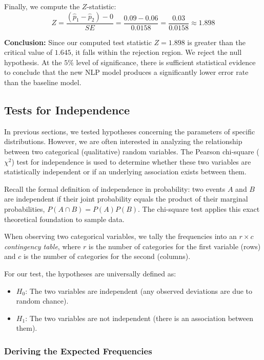 \documentclass{article}
\begin{document}
Finally, we compute the $Z$-statistic:
$$ Z = \frac{(\hat{p}_1 - \hat{p}_2) - 0}{SE} = \frac{0.09 - 0.06}{0.0158} = \frac{0.03}{0.0158} \approx 1.898 $$

\textbf{Conclusion:} 
Since our computed test statistic $Z = 1.898$ is greater than the critical value of $1.645$, it falls within the rejection region. We reject the null hypothesis. At the $5\%$ level of significance, there is sufficient statistical evidence to conclude that the new NLP model produces a significantly lower error rate than the baseline model.

\subsection{Tests for Independence}

In previous sections, we tested hypotheses concerning the parameters of specific distributions. However, we are often interested in analyzing the relationship between two categorical (qualitative) random variables. The Pearson chi-square ($\chi^2$) test for independence is used to determine whether these two variables are statistically independent or if an underlying association exists between them.

Recall the formal definition of independence in probability: two events $A$ and $B$ are independent if their joint probability equals the product of their marginal probabilities, $P(A \cap B) = P(A)P(B)$. The chi-square test applies this exact theoretical foundation to sample data. 

When observing two categorical variables, we tally the frequencies into an $r \times c$ \emph{contingency table}, where $r$ is the number of categories for the first variable (rows) and $c$ is the number of categories for the second (columns). 

For our test, the hypotheses are universally defined as:
\begin{itemize}
    \item $H_0$: The two variables are independent (any observed deviations are due to random chance).
    \item $H_1$: The two variables are not independent (there is an association between them).
\end{itemize}

\subsubsection{Deriving the Expected Frequencies}
\end{document}
